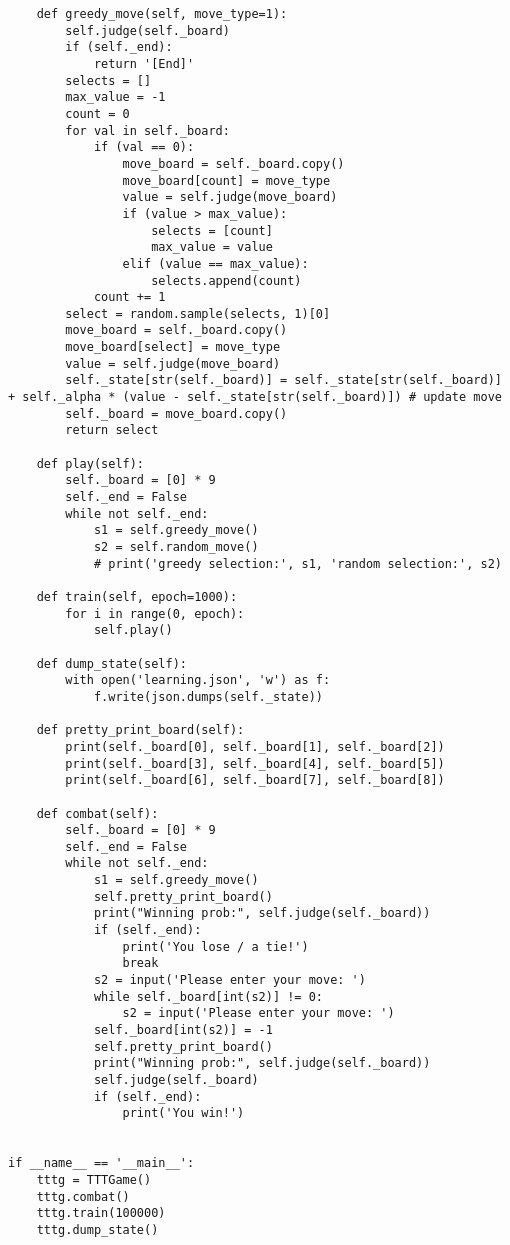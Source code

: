 \documentclass{article}
\begin{document}
\begin{verbatim}
    def greedy_move(self, move_type=1):
        self.judge(self._board)
        if (self._end):
            return '[End]'
        selects = []
        max_value = -1
        count = 0
        for val in self._board:
            if (val == 0):
                move_board = self._board.copy()
                move_board[count] = move_type
                value = self.judge(move_board)
                if (value > max_value):
                    selects = [count]
                    max_value = value
                elif (value == max_value):
                    selects.append(count)
            count += 1
        select = random.sample(selects, 1)[0]
        move_board = self._board.copy()
        move_board[select] = move_type
        value = self.judge(move_board)
        self._state[str(self._board)] = self._state[str(self._board)] + self._alpha * (value - self._state[str(self._board)]) # update move 
        self._board = move_board.copy()
        return select       

    def play(self):
        self._board = [0] * 9
        self._end = False
        while not self._end:
            s1 = self.greedy_move()
            s2 = self.random_move()
            # print('greedy selection:', s1, 'random selection:', s2)

    def train(self, epoch=1000):
        for i in range(0, epoch):
            self.play()

    def dump_state(self):
        with open('learning.json', 'w') as f:
            f.write(json.dumps(self._state))

    def pretty_print_board(self):
        print(self._board[0], self._board[1], self._board[2])
        print(self._board[3], self._board[4], self._board[5])
        print(self._board[6], self._board[7], self._board[8])

    def combat(self):
        self._board = [0] * 9
        self._end = False
        while not self._end:
            s1 = self.greedy_move()
            self.pretty_print_board()
            print("Winning prob:", self.judge(self._board))
            if (self._end):
                print('You lose / a tie!')
                break
            s2 = input('Please enter your move: ')
            while self._board[int(s2)] != 0:
                s2 = input('Please enter your move: ')
            self._board[int(s2)] = -1
            self.pretty_print_board()
            print("Winning prob:", self.judge(self._board))
            self.judge(self._board)
            if (self._end):
                print('You win!')


if __name__ == '__main__':
    tttg = TTTGame()
    tttg.combat()
    tttg.train(100000)
    tttg.dump_state()   
\end{verbatim}
\end{document}
